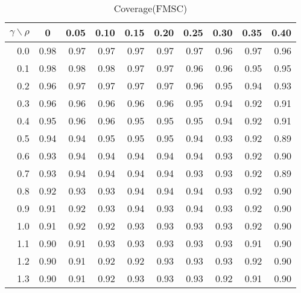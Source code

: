 \documentclass[12pt]{article}
\begin{document}
%
\begin{table}[!tbp]
\caption{Coverage(FMSC)}
 \begin{center}
 \begin{tabular}{r|rrrrrrrrr}\hline\hline
\multicolumn{1}{c|}{$\gamma\backslash\rho$}&\multicolumn{1}{c}{0}&\multicolumn{1}{c}{0.05}&\multicolumn{1}{c}{0.10}&\multicolumn{1}{c}{0.15}&\multicolumn{1}{c}{0.20}&\multicolumn{1}{c}{0.25}&\multicolumn{1}{c}{0.30}&\multicolumn{1}{c}{0.35}&\multicolumn{1}{c}{0.40}\tabularnewline
\hline
0.0&0.98&0.97&0.97&0.97&0.97&0.97&0.96&0.97&0.96\tabularnewline
0.1&0.98&0.98&0.98&0.97&0.97&0.96&0.96&0.95&0.95\tabularnewline
0.2&0.96&0.97&0.97&0.97&0.97&0.96&0.95&0.94&0.93\tabularnewline
0.3&0.96&0.96&0.96&0.96&0.96&0.95&0.94&0.92&0.91\tabularnewline
0.4&0.95&0.96&0.96&0.95&0.95&0.95&0.94&0.92&0.91\tabularnewline
0.5&0.94&0.94&0.95&0.95&0.95&0.94&0.93&0.92&0.89\tabularnewline
0.6&0.93&0.94&0.94&0.94&0.94&0.94&0.93&0.92&0.90\tabularnewline
0.7&0.93&0.94&0.94&0.94&0.94&0.93&0.93&0.92&0.89\tabularnewline
0.8&0.92&0.93&0.93&0.94&0.94&0.94&0.93&0.92&0.90\tabularnewline
0.9&0.91&0.92&0.93&0.94&0.93&0.94&0.93&0.92&0.90\tabularnewline
1.0&0.91&0.92&0.92&0.93&0.93&0.93&0.93&0.92&0.90\tabularnewline
1.1&0.90&0.91&0.93&0.93&0.93&0.93&0.93&0.91&0.90\tabularnewline
1.2&0.90&0.91&0.92&0.92&0.93&0.93&0.93&0.92&0.90\tabularnewline
1.3&0.90&0.91&0.92&0.93&0.93&0.93&0.92&0.91&0.90\tabularnewline
\hline
\end{tabular}

\end{center}

\end{table}
\end{document}
